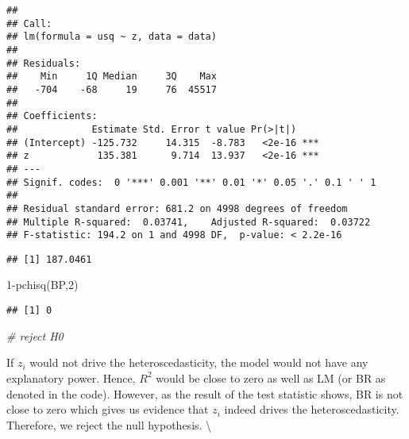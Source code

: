 \documentclass[
]{article}
\newenvironment{Shaded}{\begin{snugshade}}{\end{snugshade}}
\newcommand{\CommentTok}[1]{\textcolor[rgb]{0.56,0.35,0.01}{\textit{#1}}}
\newcommand{\DecValTok}[1]{\textcolor[rgb]{0.00,0.00,0.81}{#1}}
\newcommand{\FunctionTok}[1]{\textcolor[rgb]{0.00,0.00,0.00}{#1}}
\newcommand{\NormalTok}[1]{#1}
\newcommand{\OtherTok}[1]{\textcolor[rgb]{0.56,0.35,0.01}{#1}}
\newcommand{\SpecialCharTok}[1]{\textcolor[rgb]{0.00,0.00,0.00}{#1}}
\begin{document}
\begin{verbatim}
## 
## Call:
## lm(formula = usq ~ z, data = data)
## 
## Residuals:
##    Min     1Q Median     3Q    Max 
##   -704    -68     19     76  45517 
## 
## Coefficients:
##             Estimate Std. Error t value Pr(>|t|)    
## (Intercept) -125.732     14.315  -8.783   <2e-16 ***
## z            135.381      9.714  13.937   <2e-16 ***
## ---
## Signif. codes:  0 '***' 0.001 '**' 0.01 '*' 0.05 '.' 0.1 ' ' 1
## 
## Residual standard error: 681.2 on 4998 degrees of freedom
## Multiple R-squared:  0.03741,    Adjusted R-squared:  0.03722 
## F-statistic: 194.2 on 1 and 4998 DF,  p-value: < 2.2e-16
\end{verbatim}

\begin{Shaded}
\end{Shaded}

\begin{verbatim}
## [1] 187.0461
\end{verbatim}

\begin{Shaded}
\begin{Highlighting}[]
\DecValTok{1}\SpecialCharTok{{-}}\FunctionTok{pchisq}\NormalTok{(BP,}\DecValTok{2}\NormalTok{) }
\end{Highlighting}
\end{Shaded}

\begin{verbatim}
## [1] 0
\end{verbatim}

\begin{Shaded}
\begin{Highlighting}[]
\CommentTok{\# reject H0}
\end{Highlighting}
\end{Shaded}

If \(z_i\) would not drive the heteroscedasticity, the model would not
have any explanatory power. Hence, \(R^2\) would be close to zero as
well as LM (or BR as denoted in the code). However, as the result of the
test statistic shows, BR is not close to zero which gives us evidence
that \(z_i\) indeed drives the heteroscedasticity. Therefore, we reject
the null hypothesis. \textbackslash{}
\end{document}

